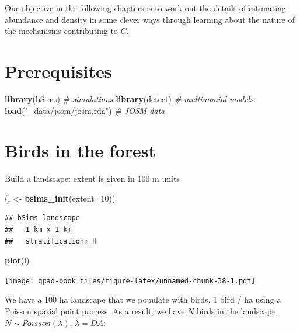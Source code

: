 \documentclass[12pt,]{book}
\newenvironment{Shaded}{\begin{snugshade}}{\end{snugshade}}
\newcommand{\CommentTok}[1]{\textcolor[rgb]{0.56,0.35,0.01}{\textit{#1}}}
\newcommand{\DataTypeTok}[1]{\textcolor[rgb]{0.13,0.29,0.53}{#1}}
\newcommand{\DecValTok}[1]{\textcolor[rgb]{0.00,0.00,0.81}{#1}}
\newcommand{\KeywordTok}[1]{\textcolor[rgb]{0.13,0.29,0.53}{\textbf{#1}}}
\newcommand{\NormalTok}[1]{#1}
\newcommand{\StringTok}[1]{\textcolor[rgb]{0.31,0.60,0.02}{#1}}
\begin{document}
Our objective in the following chapters is to work out the details of
estimating abundance and density in some clever ways through
learning about the nature of the mechanisms contributing to \(C\).

\hypertarget{prerequisites-2}{%
\section{Prerequisites}\label{prerequisites-2}}

\begin{Shaded}
\begin{Highlighting}[]
\KeywordTok{library}\NormalTok{(bSims)                }\CommentTok{# simulations}
\KeywordTok{library}\NormalTok{(detect)               }\CommentTok{# multinomial models}
\KeywordTok{load}\NormalTok{(}\StringTok{"_data/josm/josm.rda"}\NormalTok{)   }\CommentTok{# JOSM data}
\end{Highlighting}
\end{Shaded}

\hypertarget{birds-in-the-forest}{%
\section{Birds in the forest}\label{birds-in-the-forest}}

Build a landscape: extent is given in 100 m units

\begin{Shaded}
\begin{Highlighting}[]
\NormalTok{(l <-}\StringTok{ }\KeywordTok{bsims_init}\NormalTok{(}\DataTypeTok{extent=}\DecValTok{10}\NormalTok{))}
\end{Highlighting}
\end{Shaded}

\begin{verbatim}
## bSims landscape
##   1 km x 1 km
##   stratification: H
\end{verbatim}

\begin{Shaded}
\begin{Highlighting}[]
\KeywordTok{plot}\NormalTok{(l)}
\end{Highlighting}
\end{Shaded}

\texttt{[image: qpad-book\_files/figure-latex/unnamed-chunk-38-1.pdf]}

We have a 100 ha landscape that we populate with birds,
1 bird / ha using a Poisson spatial point process.
As a result, we have \(N\) birds in the landscape,
\(N \sim Poisson(\lambda)\), \(\lambda = DA\):
\end{document}
